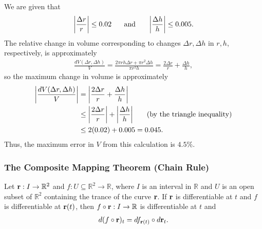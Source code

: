 \documentclass[12pt,letterpaper,reqno]{article}
\numberwithin{equation}{section}
\newcommand{\R}{\ensuremath{\mathbb R}}
\newcommand{\bbr}{{\bf r}}
\begin{document}
{\begin{example}
	We are given that
	\begin{align*}
		\left|\frac{\Delta r}{r}\right|\leq 0.02 \hspace{0.5cm} \text{ and } \hspace{0.5cm} \left|\frac{\Delta h}{h}\right|\leq 0.005.
	\end{align*}
	The relative change in volume corresponding to changes $\Delta r, \Delta h$ in $r,h$, respectively, is approximately
	\begin{align*}
		\frac{dV(\Delta r,\Delta h )}{V}=\frac{2\pi r h \Delta r+\pi r^2 \Delta h}{\pi r^2 h}=\frac{2 \Delta r}{r}+\frac{\Delta h}{h},
	\end{align*}
	so the maximum change in volume is approximately
	\begin{align*}
		\left|\frac{dV(\Delta r,\Delta h)}{V}\right|&=\left|\frac{2 \Delta r}{r}+\frac{\Delta h}{h}\right| \\
		&\leq \left|\frac{2 \Delta r}{r}\right|+\left|\frac{\Delta h}{h}\right| \hspace{0.5cm} \text{ (by the triangle inequality)}\\
		&\leq 2(0.02)+0.005=0.045.
	\end{align*}
	Thus, the maximum error in $V$ from this calculation is $4.5\%$.
\end{example}

\subsubsection{The Composite Mapping Theorem (Chain Rule)}
\begin{thm}
	Let $\bbr:I \to \R^2$ and $f:U \subseteq \R^2 \to \R$, where $I$ is an interval in $\R$ and $U$ is an open subset of $\R^2$ containing the trance of the curve $\bbr$. If $\bbr$ is differentiable at $t$ and $f$ is differentiable at $\bbr(t)$, then $f \circ \bbr:I \to \R$ is differentiable at $t$ and
	\begin{align*}
		d(f \circ \bbr)_{t}=df_{\bbr(t)} \circ d\bbr_t.
	\end{align*}
\end{thm}

}
\end{document}
